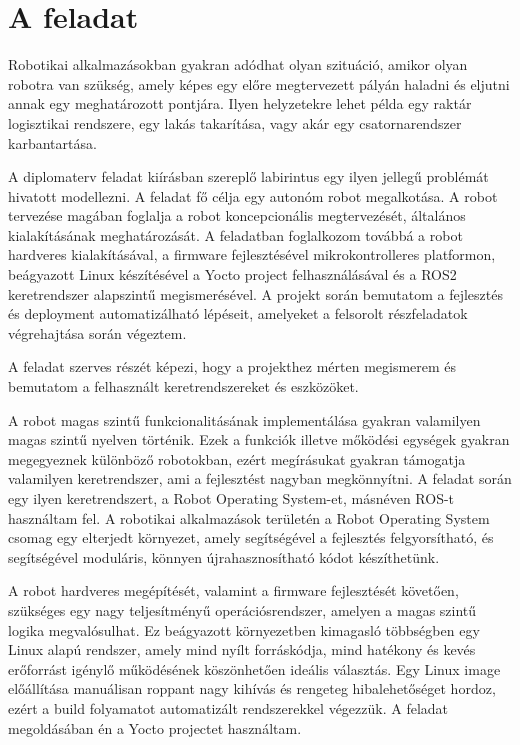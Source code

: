 \section{A feladat}

Robotikai alkalmazásokban gyakran adódhat olyan szituáció, amikor olyan robotra
van szükség, amely képes egy előre megtervezett pályán haladni és eljutni annak
egy meghatározott pontjára. Ilyen helyzetekre lehet példa egy raktár logisztikai
rendszere, egy lakás takarítása, vagy akár egy csatornarendszer karbantartása.

\medskip

A diplomaterv feladat kiírásban szereplő labirintus egy ilyen jellegű problémát
hivatott modellezni. A feladat fő célja egy autonóm robot megalkotása. A robot
tervezése magában foglalja a robot koncepcionális megtervezését, általános
kialakításának meghatározását. A feladatban foglalkozom továbbá a robot hardveres
kialakításával, a firmware fejlesztésével mikrokontrolleres platformon,
beágyazott Linux készítésével a Yocto project felhasználásával és a ROS2
keretrendszer alapszintű megismerésével. A projekt során bemutatom a fejlesztés
és deployment automatizálható lépéseit, amelyeket a felsorolt részfeladatok
végrehajtása során végeztem.

A feladat szerves részét képezi, hogy a projekthez mérten megismerem és bemutatom
a felhasznált keretrendszereket és eszközöket.

A robot magas szintű funkcionalitásának implementálása gyakran valamilyen magas
szintű nyelven történik. Ezek a funkciók illetve mőködési egységek gyakran
megegyeznek különböző robotokban, ezért megírásukat gyakran támogatja valamilyen
keretrendszer, ami a fejlesztést nagyban megkönnyítni. A feladat során egy ilyen
keretrendszert, a Robot Operating System-et, másnéven ROS-t használtam fel. A
robotikai alkalmazások területén a Robot Operating System csomag egy elterjedt
környezet, amely segítségével a fejlesztés felgyorsítható, és segítségével
moduláris, könnyen újrahasznosítható kódot készíthetünk.

A robot hardveres megépítését, valamint a firmware fejlesztését követően,
szükséges egy nagy teljesítményű operációsrendszer, amelyen a magas szintű logika
megvalósulhat. Ez beágyazott környezetben kimagasló többségben egy Linux alapú
rendszer, amely mind nyílt forráskódja, mind hatékony és kevés erőforrást igénylő
működésének köszönhetően ideális választás. Egy Linux image előállítása
manuálisan roppant nagy kihívás és rengeteg hibalehetőséget hordoz, ezért a build
folyamatot automatizált rendszerekkel végezzük. A feladat megoldásában én a Yocto
projectet használtam.

